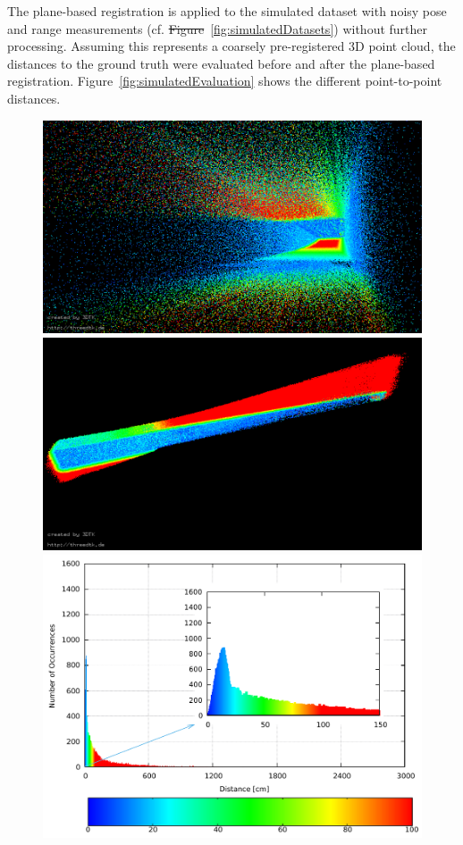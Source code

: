 \documentclass[5p]{elsarticle}
\providecommand{\DIFaddtex}[1]{{\protect\color{blue}\uwave{#1}}} %
\providecommand{\DIFdeltex}[1]{{\protect\color{red}\sout{#1}}}                      %
\providecommand{\DIFaddbegin}{} %
\providecommand{\DIFaddend}{} %
\providecommand{\DIFdelbegin}{} %
\providecommand{\DIFdelend}{} %
\providecommand{\DIFadd}[1]{\texorpdfstring{\DIFaddtex{#1}}{#1}} %
\providecommand{\DIFdel}[1]{\texorpdfstring{\DIFdeltex{#1}}{}} %
\begin{document}
The plane-based registration is applied to the simulated dataset with noisy pose and range measurements (cf. \DIFdelbegin \DIFdel{Figure}\DIFdelend \DIFaddbegin \DIFadd{figure}\DIFaddend ~\ref{fig:simulatedDatasets}) without further processing.
Assuming this represents a coarsely pre-registered 3D point cloud, the distances to the ground truth were evaluated before and after the plane-based registration. 
Figure~\ref{fig:simulatedEvaluation} shows the different point-to-point distances. 

\begin{figure}
 	\centering
 	\begin{minipage}[c]{0.495\textwidth}
 		\centering
		\includegraphics[width=\textwidth]{./images/uncorr_bottom_pose}\\
		\includegraphics[width=\textwidth]{./images/uncorr_side_view}\\
  		\includegraphics[width=\textwidth]{./images/uncorr_hist}

\end{minipage}
\end{figure}
\end{document}
